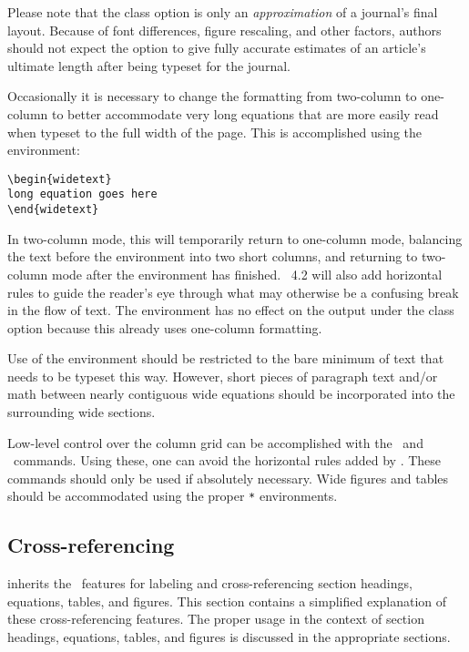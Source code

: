 \documentclass[%
,aps%
 ,twocolumn%
 ,secnumarabic%
,amssymb, amsmath,nobibnotes, aps, prl, floatfix]{revtex4-2}
\begin{document}
Please note that the  class option is only an \textit{approximation} of a journal's final layout. Because of font differences, figure rescaling, and other factors, authors should not expect the  option to give fully accurate estimates of an article's ultimate length after being typeset for the journal.

Occasionally it is necessary to change the formatting from two-column to
one-column to better accommodate very long equations that are more
easily read when typeset to the full width of the page. This is
accomplished using the  environment:
\begin{verbatim}
\begin{widetext}
long equation goes here
\end{widetext}
\end{verbatim}
In two-column mode, this will temporarily return to one-column mode,
balancing the text before the environment into two short columns, and
returning to two-column mode after the environment has
finished. \revtex~4.2 will also add horizontal rules to guide the
reader's eye through what may otherwise be a confusing break in the
flow of text. The
 environment has no effect on the output under the 
 class option because this already uses
one-column formatting.

Use of the  environment should be restricted to the bare
minimum of text that needs to be typeset this way. However, short pieces
of paragraph text and/or math between nearly contiguous wide equations
should be incorporated into the surrounding wide sections.

Low-level control over the column grid can be accomplished with the
\cmd\onecolumngrid\ and \cmd\twocolumngrid\ commands. Using these, one
can avoid the horizontal rules added by . These commands
should only be used if absolutely necessary. Wide figures and tables
should be accommodated using the proper \verb+*+ environments.

\subsection{Cross-referencing}\label{sec:xrefs}

\revtex{} inherits the \LaTeXe\ features for labeling and cross-referencing
section headings, equations, tables, and figures. This section
contains a simplified explanation of these cross-referencing features.
The proper usage in the context of section headings, equations,
tables, and figures is discussed in the appropriate sections.
\end{document}
